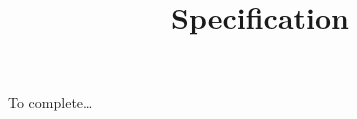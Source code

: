 \documentclass[11pt]{article}
\begin{document}
\title{Specification}
\author{}
\date{}
\maketitle

To complete\dots
\end{document}
